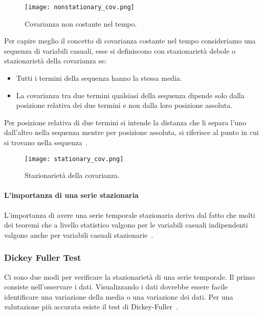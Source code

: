 \begin{enumerate}
    \begin{figure}[H]
        \centering
        \texttt{[image: nonstationary\_cov.png]}
        \caption{Covarianza non costante nel tempo.}
        \label{fig:nons_cov}
    \end{figure}

    Per capire meglio il concetto di covarianza costante nel tempo 
    consideriamo una sequenza di variabili casuali, esse si definiscono
    con stazionarietà debole o stazionarietà della covarianza se:

    \begin{itemize}
        \setlength\itemsep{-0.6em}
        \item Tutti i termini della sequenza hanno la stessa media.
        \item La covarianza tra due termini qualsiasi della sequenza 
        dipende solo dalla posizione relativa dei due termini e non dalla 
        loro posizione assoluta.
    \end{itemize}

    Per posizione relativa di due termini si intende la distanza che 
    li separa l'uno dall'altro nella sequenza mentre per posizione assoluta, 
    si riferisce al punto in cui si trovano nella sequenza~\cite{sl:cov_stat}.

    \begin{figure}[H]
        \centering
        \texttt{[image: stationary\_cov.png]}
        \caption{Stazionarietà della covarianza.}
    \end{figure}

\end{enumerate}

\paragraph{L'importanza di una serie stazionaria} 
L'importanza di avere una serie temporale stazionaria deriva dal fatto che 
molti dei teoremi che a livello statistico valgono per le variabili casuali indipendenti
valgono anche per variabili casuali stazionarie~\cite{sa:stationary}.


\subsubsection{Dickey Fuller Test}
Ci sono due modi per verificare la stazionarietà di una serie temporale. 
Il primo consiste nell'osservare i dati. Visualizzando i dati dovrebbe essere 
facile identificare una variazione della media o una variazione dei dati. 
Per una valutazione più accurata esiste il test di Dickey-Fuller~\cite{sa:stationary}.

